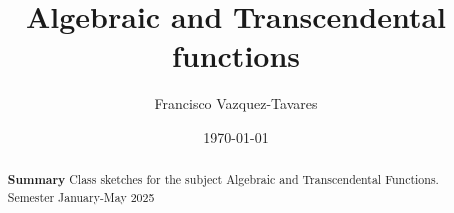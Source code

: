 \documentclass[a4paper]{tufte-handout} %
\title{ Algebraic and Transcendental functions }
\author{Francisco Vazquez-Tavares}
\date{\today} %
\begin{document}
\maketitle %


\begin{abstract}
	\textbf{Summary}
        Class sketches for the subject Algebraic and Transcendental Functions.
        Semester January-May 2025
\end{abstract}



%
%
%
%



\nocite{*}


\end{document}
